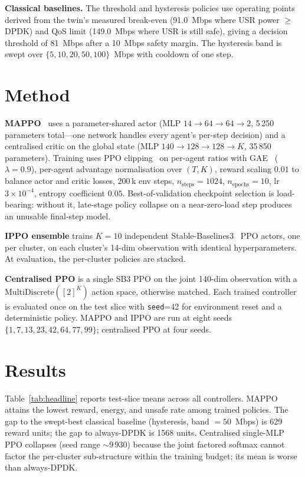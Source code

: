 \documentclass[journal]{IEEEtran}
\begin{document}
\noindent\textbf{Classical baselines.} The threshold and hysteresis
policies use operating points derived from the twin's measured
break-even (91.0~Mbps where USR power $\geq$ DPDK) and QoS limit
(149.0~Mbps where USR is still safe), giving a decision threshold of
81~Mbps after a 10~Mbps safety margin. The hysteresis band is swept
over $\{5, 10, 20, 50, 100\}$~Mbps with cooldown of one step.

\section{Method}
\label{sec:method}
\noindent\textbf{MAPPO}~\cite{ref:mappo} uses a parameter-shared
actor (MLP $14\!\to\!64\!\to\!64\!\to\!2$, 5\,250 parameters
total---one network handles every agent's per-step decision) and a
centralised critic on the global state
(MLP $140\!\to\!128\!\to\!128\!\to\!K$, 35\,850 parameters).
Training uses PPO clipping~\cite{ref:ppo} on per-agent ratios with
GAE~\cite{ref:gae} ($\lambda\!=\!0.9$), per-agent advantage
normalisation over $(T,K)$, reward scaling $0.01$ to balance actor
and critic losses, 200\,k env steps, $n_{\mathrm{steps}}\!=\!1024$,
$n_{\mathrm{epochs}}\!=\!10$, lr $3\!\times\!10^{-4}$, entropy
coefficient $0.05$. Best-of-validation checkpoint selection is
load-bearing: without it, late-stage policy collapse on a
near-zero-load step produces an unusable final-step model.

\noindent\textbf{IPPO ensemble} trains $K\!=\!10$ independent
Stable-Baselines3~\cite{ref:sb3} PPO actors, one per cluster, on
each cluster's 14-dim observation with identical hyperparameters. At
evaluation, the per-cluster policies are stacked.

\noindent\textbf{Centralised PPO} is a single SB3 PPO on the joint
140-dim observation with a $\mathrm{MultiDiscrete}([2]^{K})$ action
space, otherwise matched. Each trained controller is evaluated once
on the test slice with \texttt{seed}=42 for environment reset and a
deterministic policy. MAPPO and IPPO are run at eight seeds
$\{1, 7, 13, 23, 42, 64, 77, 99\}$; centralised PPO at four seeds.

\section{Results}
\label{sec:results}
Table~\ref{tab:headline} reports test-slice means across all
controllers. MAPPO attains the lowest reward, energy, and unsafe
rate among trained policies. The gap to the swept-best classical
baseline (hysteresis, band $=50$~Mbps) is 629 reward units; the gap
to always-DPDK is 1568 units. Centralised single-MLP PPO collapses
(seed range $\sim\!9\,930$) because the joint factored softmax
cannot factor the per-cluster sub-structure within the training
budget; its mean is worse than always-DPDK.
\end{document}
